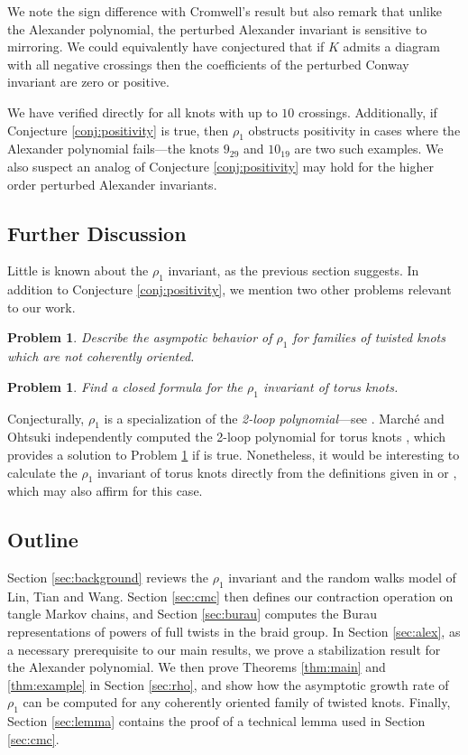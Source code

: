 \documentclass[11pt,hyp,]{nyjm}
\numberwithin{thm}{section}
\newtheorem{prob}[thm]{Problem}
\theoremstyle{definition}
\theoremstyle{remark}
\begin{document}
	We note the sign difference with Cromwell's result but also remark that unlike the Alexander polynomial, the perturbed Alexander invariant is sensitive to mirroring. We could equivalently have conjectured that if $K$ admits a diagram with all negative crossings then the coefficients of the perturbed Conway invariant are zero or positive.

	We have verified  directly for all knots with up to $10$ crossings. Additionally, if Conjecture \ref{conj:positivity} is true, then $\rho_1$ obstructs positivity in cases where the Alexander polynomial fails---the knots $9_{29}$ and $10_{19}$ are two such examples. We also suspect an analog of Conjecture \ref{conj:positivity} may hold for the higher order perturbed Alexander invariants.
	
	\subsection{Further Discussion}
	
	Little is known about the $\rho_1$ invariant, as the previous section suggests. In addition to Conjecture \ref{conj:positivity}, we mention two other problems relevant to our work.
	
	\begin{prob}
		Describe the asympotic behavior of $\rho_1$ for families of twisted knots which are not coherently oriented.
	\end{prob}
	
	\begin{prob}
		\label{prob:tk}
		Find a closed formula for the $\rho_1$ invariant of torus knots.
	\end{prob}

	Conjecturally, $\rho_1$ is a specialization of the {\em 2-loop polynomial}---see \cite[Conjecture 7.11]{bec24}. March\'e and Ohtsuki independently computed the 2-loop polynomial for torus knots \cite{mar04, oht04}, which provides a solution to Problem \ref{prob:tk} if \cite[Conjecture 7.11]{bec24} is true. Nonetheless, it would be interesting to calculate the $\rho_1$ invariant of torus knots directly from the definitions given in \cite{bnvdv21} or \cite{bnvdv22}, which may also affirm \cite[Conjecture 7.11]{bec24} for this case.
	
	\subsection{Outline}
	
	Section \ref{sec:background} reviews the $\rho_1$ invariant and the random walks model of Lin, Tian and Wang. Section \ref{sec:cmc} then defines our contraction operation on tangle Markov chains, and Section \ref{sec:burau} computes the Burau representations of powers of full twists in the braid group. In Section \ref{sec:alex}, as a necessary prerequisite to our main results, we prove a stabilization result for the Alexander polynomial. We then prove Theorems \ref{thm:main} and \ref{thm:example} in Section \ref{sec:rho}, and show how the asymptotic growth rate of $\rho_1$ can be computed for any coherently oriented family of twisted knots. Finally, Section \ref{sec:lemma} contains the proof of a technical lemma used in Section \ref{sec:cmc}.
	
\end{document}
